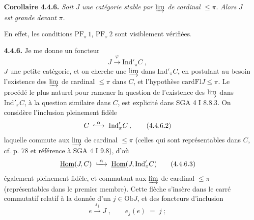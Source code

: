 \documentclass[11pt]{article}
\newcommand{\msp}[1]{\marginpar{\footnotesize [#1]}}
\newcommand{\uHom}{\underline{\mathrm{Hom}}}
\newcommand{\Ind}{\mathrm{Ind}}
\newcommand{\card}{\mathrm{card}}
\newcommand{\Fl}{\mathrm{Fl}}
\newcommand{\Ob}{\mathrm{Ob}}
\newcommand{\hookxrightarrow}[2][]{\lhook\joinrel\xrightarrow[#1]{#2}}
\begin{document}
\textbf{Corollaire 4.4.6.} \textit{Soit $J$ une catégorie stable par} $\varinjlim$ \textit{de cardinal $\leqslant \pi$. Alors $J$ est grande devant $\pi$.}

En effet, les conditions $\mathrm{PF}_{\pi}\,1$, $\mathrm{PF}_{\pi}\,2$ sont visiblement vérifiées.

\msp{page 83}
\textbf{4.4.6.} Je me donne un foncteur %
\[
J \xrightarrow{\;\varphi\;} \Ind'_\pi C \;, \tag*{(4.4.6.1)}
\]
$J$ une petite catégorie, et on cherche une $\varinjlim$ dans $\Ind'_\pi C$, en postulant au besoin l'existence des $\varinjlim$ de cardinal $\leqslant \pi$ dans $C$, et l'hypothèse $\card\Fl J \leqslant \pi$. Le procédé le plus naturel pour ramener la question de l'existence des $\varinjlim$ dans $\Ind'_\pi C$, à la question similaire dans $C$, est explicité dans SGA 4 I 8.8.3. On considère l'inclusion pleinement fidèle
\[
C \;\hookxrightarrow{\;\alpha\;}\; \Ind'_\pi C \;, \tag*{(4.4.6.2)}
\]
laquelle commute aux $\varinjlim$ de cardinal $\leqslant \pi$ (celles qui sont représentables dans $C$, cf. p. 78 et référence à SGA 4 I 9.8), d'où
\[
\uHom(J,C) \;\hookxrightarrow{\;\alpha\;}\; \uHom(J,\Ind'_\pi C) \tag*{(4.4.6.3)}
\]
également pleinement fidèle, et commutant aux $\varinjlim$ de cardinal $\leqslant \pi$ (représentables dans le premier membre). Cette flèche s'insère dans le carré commutatif relatif à la donnée d'un $j \in \Ob J$, et des foncteurs d'inclusion
\[
e \xrightarrow{\;\varepsilon_j\;} J \;, \qquad e_j(e) \;=\; j \;; \tag*{(4.4.6.4)} %
\]
\end{document}
